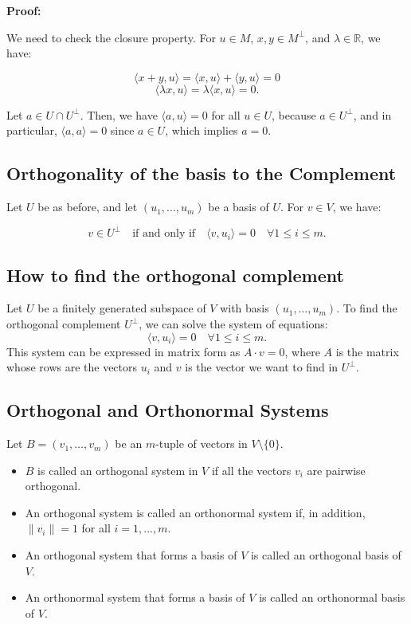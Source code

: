 \textbf{Proof:}
\vspace{\baselineskip}

We need to check the closure property. For \( u \in M \), \( x, y \in M^\perp \), and \( \lambda \in \mathbb{R} \), we have:

\[
\langle x + y, u \rangle = \langle x, u \rangle + \langle y, u \rangle = 0
\]
\[
\langle \lambda x, u \rangle = \lambda \langle x, u \rangle = 0.
\]

Let \( a \in U \cap U^\perp \). Then, we have \( \langle a, u \rangle = 0 \) for all \( u \in U \), because \( a \in U^\perp \), and in particular, \( \langle a, a \rangle = 0 \) since \( a \in U \), which implies \( a = 0 \).

\subsection{Orthogonality of the basis to the Complement}

Let \( U \) be as before, and let \( (u_1, \ldots, u_m) \) be a basis of \( U \). For \( v \in V \), we have:

\[
v \in U^\perp \quad \text{if and only if} \quad \langle v, u_i \rangle = 0 \quad \forall 1 \leq i \leq m.
\]

\subsection{How to find the orthogonal complement}
Let \( U \) be a finitely generated subspace of \( V \) with basis \( (u_1, \ldots, u_m) \). To find the orthogonal complement \( U^\perp \), we can solve the system of equations:
\[
\langle v, u_i \rangle = 0 \quad \forall 1 \leq i \leq m.
\]
This system can be expressed in matrix form as \( A \cdot v = 0 \), where \( A \) is the matrix whose rows are the vectors \( u_i \) and \( v \) is the vector we want to find in \( U^\perp \).

\subsection{Orthogonal and Orthonormal Systems}
Let \( B = (v_1, \ldots, v_m) \) be an \( m \)-tuple of vectors in \( V \setminus \{0\} \).
\begin{itemize}[label=\(-\)]
    \item \( B \) is called an orthogonal system in \( V \) if all the vectors \( v_i \) are pairwise orthogonal.
    \item An orthogonal system is called an orthonormal system if, in addition, \( \|v_i\| = 1 \) for all \( i = 1, \ldots, m \).
    \item An orthogonal system that forms a basis of \( V \) is called an orthogonal basis of \( V \).
    \item An orthonormal system that forms a basis of \( V \) is called an orthonormal basis of \( V \).
\end{itemize}

